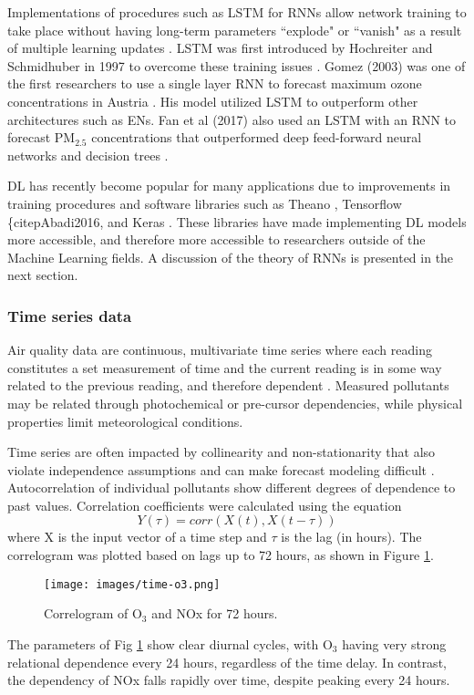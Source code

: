 Implementations of procedures such as LSTM for RNNs allow network training to take place without having long-term parameters ``explode" or ``vanish" as a result of multiple learning updates \citep{Pascanu2013}. LSTM was first introduced by Hochreiter and Schmidhuber in 1997  to overcome these training issues \citep{Hochreiter1997}. Gomez (2003) was one of the first researchers to use a single layer RNN to forecast maximum ozone concentrations in Austria \citep{Gomez2003}. His model utilized LSTM to outperform other architectures such as ENs. Fan et al (2017) also used an LSTM with an RNN to forecast PM$_{2.5}$ concentrations that outperformed deep feed-forward neural networks and decision trees \citep{Fan2017}.  

DL has recently become popular for many applications due to improvements in training procedures and software libraries such as Theano \citep{Theano2016}, Tensorflow \{citep{Abadi2016}, and Keras \citep{keras2015}. These libraries have made implementing DL models more accessible, and therefore more accessible to researchers outside of the Machine Learning fields. A discussion of the theory of RNNs is presented in the next section.

\subsubsection{Time series data}
Air quality data are continuous, multivariate time series where each reading constitutes a set measurement of time and the current reading is in some way related to the previous reading, and therefore dependent \citep{Gheyas2011}. Measured pollutants may be related through photochemical or pre-cursor dependencies, while physical properties limit meteorological conditions. 

Time series are often impacted by collinearity and non-stationarity that also violate independence assumptions and can make forecast modeling difficult \citep{Gheyas2011}. Autocorrelation of individual pollutants show different degrees of dependence to past values.  Correlation coefficients were calculated using the equation
%
\begin{equation}
\label{eq:corr}
Y(\tau)= corr(X(t),X(t - \tau))
\end{equation}
%
\noindent
where X is the input vector of a time step and $\tau$ is the lag (in hours). The correlogram was plotted based on lags up to 72 hours, as shown in Figure \ref{fig:serialcorr}.
%
\begin{figure}[H]
\centering
\texttt{[image: images/time-o3.png]}  %
\caption{Correlogram of O$_{3}$ and NOx for 72 hours.}
\label{fig:serialcorr}
\end{figure}
%
The parameters of Fig \ref{fig:serialcorr} show clear diurnal cycles, with O$_{3}$ having very strong relational dependence every 24 hours, regardless of the time delay. In contrast, the dependency of NOx falls rapidly over time, despite peaking every 24 hours. 

